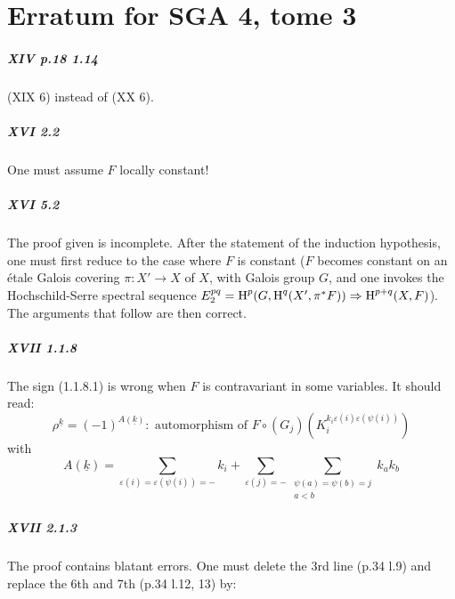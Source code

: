 
\appendix
\chapter{Erratum for SGA 4, tome 3}

\paragraph{XIV p.18 1.14}
(XIX 6) instead of (XX 6).

\paragraph{XVI 2.2}
One must assume $F$ locally constant!

\paragraph{XVI 5.2}
The proof given is incomplete. After the statement of
the induction hypothesis, one must first reduce to the case where $F$ is
constant ($F$ becomes constant on an étale Galois covering
$\pi:X'\to X$ of $X$, with Galois group $G$, and one invokes the
Hochschild-Serre spectral sequence
$E_2^{p q}=\operatorname{H}^p(G,\operatorname{H}^q(X',\pi^\ast F))\Rightarrow \operatorname{H}^{p+q}(X,F)$).
The arguments that follow are then correct.

\paragraph{XVII 1.1.8}
The sign (1.1.8.1) is wrong when $F$ is contravariant in some
variables. It should read:
\begin{equation*}\tag{1.1.8.1}
  \rho^{\underline k} = (-1)^{A(\underline k)}: \text{ automorphism of }
F\circ (G_j)\left(K_i^{k_i\varepsilon(i)\varepsilon(\psi(i))}\right)
\end{equation*}
with
\[
  A(\underline k) = \sum_{\varepsilon(i) = \varepsilon(\psi(i))=-} k_i + \sum_{\varepsilon(j)=-} \sum_{\substack{\psi(a)=\psi(b)=j \\ a<b}} k_a k_b
\]

\paragraph{XVII 2.1.3}
The proof contains blatant errors. One must delete the
3rd line (p.34 l.9) and replace the 6th and 7th (p.34 l.12, 13)
by:

